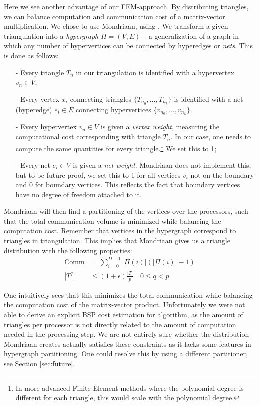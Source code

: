 \documentclass[11pt]{amsart}
\theoremstyle{definition}
\begin{document}
Here we see another advantage of our FEM-approach. By distributing triangles, we can balance computation and communication cost of a matrix-vector multiplication. We chose to use Mondriaan, using \cite{bissmondriaan,biss2012}. We transform a given triangulation into a \emph{hypergraph} $H = (V,E)$ -- a generalization of a graph in which any number of hypervertices can be connected by hyperedges or \emph{nets}. This is done as follows:
\begin{itemize}
  \item[-] Every triangle $T_n$ in our triangulation is identified with a hypervertex $v_n \in V$;
	\item[-] Every vertex $x_i$ connecting triangles $\{T_{n_0}, \ldots, T_{n_k}\}$ is identified with a net (hyperedge) $e_i \in E$ connecting hypervertices $\{v_{n_0}, \ldots, v_{n_k}\}$.
  \item[-] Every hypervertex $v_n \in V$ is given a \emph{vertex weight}, measuring the computational cost corresponding with triangle $T_n$. In our case, one needs to compute the same quantities for every triangle.\footnote{In more advanced Finite Element methods where the polynomial degree is different for each triangle, this would scale with the polynomial degree.} We set this to 1;
  \item[-] Every net $e_i\in V$ is given a \emph{net weight}. Mondriaan does not implement this, but to be future-proof, we set this to 1 for all vertices $v_i$ not on the boundary and 0 for boundary vertices. This reflects the fact that boundary vertices have no degree of freedom attached to it.
\end{itemize}
Mondriaan will then find a partitioning of the vertices over the processors, such that the total communication volume is minimized while balancing the computation cost. Remember that vertices in the hypergraph correspond to triangles in triangulation. This implies that Mondriaan gives us a triangle distribution with the following properties:
\begin{align*}
	\text{Comm}&= \sum_{i=0}^{D-1} |\Pi(i)| (|\Pi(i)| -1 ) \\
	|T^q| & \leq (1 + \epsilon) \frac{|T|}{p} \quad 0 \leq q < p
\end{align*}

One intuitively sees that this minimizes the total communication while balancing the computation cost of the matrix-vector product. Unfortunately we were not able to derive an explicit BSP cost estimation for algorithm, as the amount of triangles per processor is not directly related to the amount of computation needed in the processing step. We are not entirely sure whether the distribution Mondriaan creates actually satisfies these constraints as it lacks some features in hypergraph partitioning. One could resolve this by using a different partitioner, see Section \ref{sec:future}.
\end{document}

